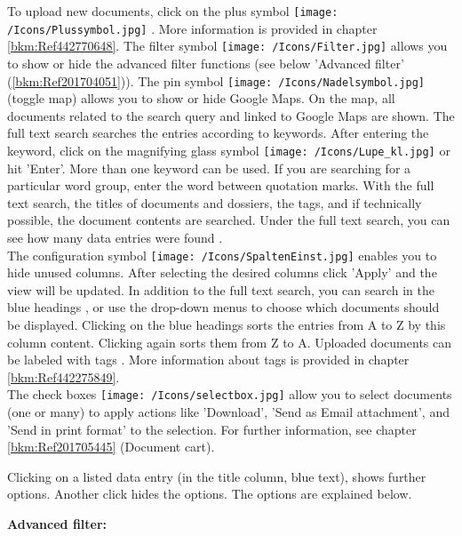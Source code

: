 To upload new documents, click on the plus symbol \texttt{[image: /Icons/Plussymbol.jpg]} . More information is provided in chapter \ref{bkm:Ref442770648}. The filter symbol \texttt{[image: /Icons/Filter.jpg]}  allows you to show or hide the advanced filter functions (see below 'Advanced filter' (\ref{bkm:Ref201704051})). The pin symbol \texttt{[image: /Icons/Nadelsymbol.jpg]} (toggle map)  allows you to show or hide Google Maps. On the map, all documents related to the search query and linked to Google Maps are shown. The full text search  searches the entries according to keywords. After entering the keyword, click on the magnifying glass symbol \texttt{[image: /Icons/Lupe\_kl.jpg]}  or hit 'Enter'. More than one keyword can be used. If you are searching for a particular word group, enter the word between quotation marks. With the full text search, the titles of documents and dossiers, the tags, and if technically possible, the document contents are searched. Under the full text search, you can see how many data entries were found .\\
The configuration symbol \texttt{[image: /Icons/SpaltenEinst.jpg]}  enables you to hide unused columns. After selecting the desired columns click 'Apply' and the view will be updated.\newline
  \newline
In addition to the full text search, you can search in the blue headings , or use the drop-down menus to choose which documents should be displayed. Clicking on the blue headings sorts the entries from A to Z by this column content. Clicking again sorts them from Z to A. \newline
Uploaded documents can be labeled with tags . More information about tags is provided in chapter \ref{bkm:Ref442275849}. \\
The check boxes \texttt{[image: /Icons/selectbox.jpg]}  allow you to select documents (one or many) to apply actions like 'Download', 'Send as Email attachment', and 'Send in print format' to the selection. For further information, see chapter \ref{bkm:Ref201705445} (Document cart).

Clicking on a listed data entry  (in the title column, blue text), shows further options. Another click hides the options. The options are explained below.

\vspace{\baselineskip}

\textbf{Advanced filter:}\\
\label{bkm:Ref201704051}

